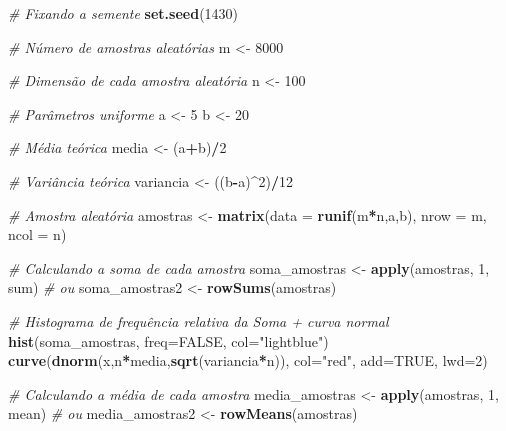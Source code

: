 \documentclass[
]{book}
\newenvironment{Shaded}{\begin{snugshade}}{\end{snugshade}}
\newcommand{\AttributeTok}[1]{\textcolor[rgb]{0.13,0.29,0.53}{#1}}
\newcommand{\CommentTok}[1]{\textcolor[rgb]{0.56,0.35,0.01}{\textit{#1}}}
\newcommand{\ConstantTok}[1]{\textcolor[rgb]{0.56,0.35,0.01}{#1}}
\newcommand{\DecValTok}[1]{\textcolor[rgb]{0.00,0.00,0.81}{#1}}
\newcommand{\FunctionTok}[1]{\textcolor[rgb]{0.13,0.29,0.53}{\textbf{#1}}}
\newcommand{\NormalTok}[1]{#1}
\newcommand{\OtherTok}[1]{\textcolor[rgb]{0.56,0.35,0.01}{#1}}
\newcommand{\SpecialCharTok}[1]{\textcolor[rgb]{0.81,0.36,0.00}{\textbf{#1}}}
\newcommand{\StringTok}[1]{\textcolor[rgb]{0.31,0.60,0.02}{#1}}
\begin{document}
\begin{Shaded}
\begin{Highlighting}[]
\CommentTok{\# Fixando a semente}
\FunctionTok{set.seed}\NormalTok{(}\DecValTok{1430}\NormalTok{)}

\CommentTok{\# Número de amostras aleatórias}
\NormalTok{m }\OtherTok{\textless{}{-}} \DecValTok{8000}

\CommentTok{\# Dimensão de cada amostra aleatória}
\NormalTok{n }\OtherTok{\textless{}{-}} \DecValTok{100}

\CommentTok{\# Parâmetros uniforme}
\NormalTok{a }\OtherTok{\textless{}{-}} \DecValTok{5}
\NormalTok{b }\OtherTok{\textless{}{-}} \DecValTok{20}

\CommentTok{\# Média teórica}
\NormalTok{media }\OtherTok{\textless{}{-}}\NormalTok{ (a}\SpecialCharTok{+}\NormalTok{b)}\SpecialCharTok{/}\DecValTok{2}

\CommentTok{\# Variância teórica}
\NormalTok{variancia }\OtherTok{\textless{}{-}}\NormalTok{ ((b}\SpecialCharTok{{-}}\NormalTok{a)}\SpecialCharTok{\^{}}\DecValTok{2}\NormalTok{)}\SpecialCharTok{/}\DecValTok{12}

\CommentTok{\# Amostra aleatória}
\NormalTok{amostras }\OtherTok{\textless{}{-}} \FunctionTok{matrix}\NormalTok{(}\AttributeTok{data =} \FunctionTok{runif}\NormalTok{(m}\SpecialCharTok{*}\NormalTok{n,a,b), }\AttributeTok{nrow =}\NormalTok{ m, }\AttributeTok{ncol =}\NormalTok{ n)}

\CommentTok{\# Calculando a soma de cada amostra}
\NormalTok{soma\_amostras }\OtherTok{\textless{}{-}} \FunctionTok{apply}\NormalTok{(amostras, }\DecValTok{1}\NormalTok{, sum)}
\CommentTok{\# ou}
\NormalTok{soma\_amostras2 }\OtherTok{\textless{}{-}} \FunctionTok{rowSums}\NormalTok{(amostras)}

\CommentTok{\# Histograma de frequência relativa da Soma + curva normal}
\FunctionTok{hist}\NormalTok{(soma\_amostras, }\AttributeTok{freq=}\ConstantTok{FALSE}\NormalTok{, }\AttributeTok{col=}\StringTok{"lightblue"}\NormalTok{)}
\FunctionTok{curve}\NormalTok{(}\FunctionTok{dnorm}\NormalTok{(x,n}\SpecialCharTok{*}\NormalTok{media,}\FunctionTok{sqrt}\NormalTok{(variancia}\SpecialCharTok{*}\NormalTok{n)), }\AttributeTok{col=}\StringTok{"red"}\NormalTok{, }\AttributeTok{add=}\ConstantTok{TRUE}\NormalTok{, }\AttributeTok{lwd=}\DecValTok{2}\NormalTok{)}

\CommentTok{\# Calculando a média de cada amostra}
\NormalTok{media\_amostras }\OtherTok{\textless{}{-}} \FunctionTok{apply}\NormalTok{(amostras, }\DecValTok{1}\NormalTok{, mean)}
\CommentTok{\# ou}
\NormalTok{media\_amostras2 }\OtherTok{\textless{}{-}} \FunctionTok{rowMeans}\NormalTok{(amostras)}


\end{Highlighting}
\end{Shaded}
\end{document}

